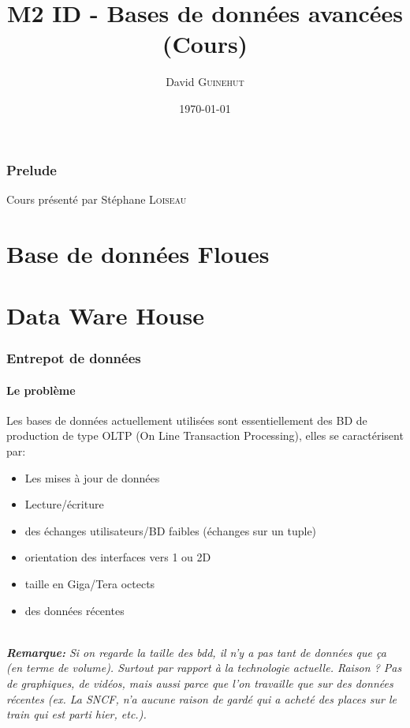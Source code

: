 \documentclass[a4paper,11pt]{article}
\title{M2 ID - Bases de données avancées \\ \normalsize (Cours)}
\author{David \textsc{Guinehut}}
\date{\today}
\begin{document}
	\renewcommand{\headrulewidth}{0.001pt}
	
	\pagestyle{fancy}
	
	\maketitle

	\tableofcontents

\section*{Prelude}
Cours présenté par Stéphane \textsc{Loiseau}

\part{Base de données Floues}


\part{Data Ware House}
\section{Entrepot de données}
\subsection{Le problème}
	Les bases de données actuellement utilisées sont essentiellement des BD de production de type OLTP (On Line Transaction Processing), elles se caractérisent par:
	\begin{itemize}
		\item Les mises à jour de données 
		\item Lecture/écriture
		\item des échanges utilisateurs/BD faibles (échanges sur un tuple)
		\item orientation des interfaces vers 1 ou 2D
		\item taille en Giga/Tera octects
		\item des données récentes
	\end{itemize}
	~\\

\emph{\textbf{Remarque:} Si on regarde la taille des bdd, il n'y a pas tant de données que ça (en terme de volume). Surtout par rapport à la technologie actuelle. Raison ? Pas de graphiques, de vidéos, mais aussi parce que l'on travaille que sur des données récentes (ex. La SNCF, n'a aucune raison de gardé qui a acheté des places sur le train qui est parti hier, etc.).}	\\
		
\end{document}
